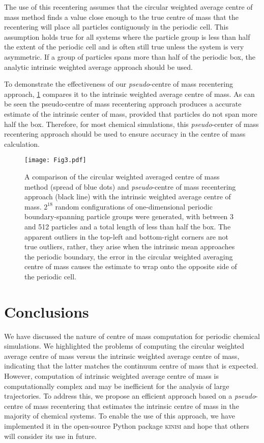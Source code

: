 \documentclass[reprint,superscriptaddress,nobibnotes,amsmath,amssymb,aip]{revtex4-2}
\begin{document}
The use of this recentering assumes that the circular weighted average centre of mass method finds a value close enough to the true centre of mass that the recentering will place all particles contiguously in the periodic cell. 
This assumption holds true for all systems where the particle group is less than half the extent of the periodic cell and is often still true unless the system is very asymmetric. 
If a group of particles spans more than half of the periodic box, the analytic intrinsic weighted average approach should be used. 

To demonstrate the effectiveness of our \emph{pseudo}-centre of mass recentering approach, \cref{fig:method_valid} compares it to the intrinsic weighted average centre of mass. 
As can be seen the pseudo-centre of mass recentering approach produces a accurate estimate of the intrinsic center of mass, provided that particles do not span more half the box. 
Therefore, for most chemical simulations, this \emph{pseudo}-center of mass recentering approach should be used to ensure accuracy in the centre of mass calculation. 
%
\begin{figure}
    \centering
    \texttt{[image: Fig3.pdf]}
    \caption{A comparison of the circular weighted averaged centre of mass method (spread of blue dots) and \emph{pseudo}-centre of mass recentering approach (black line) with the intrinsic weighted average centre of mass. 
    $2^{18}$ random configurations of one-dimensional periodic boundary-spanning particle groups were generated, with between 3 and 512 particles and a total length of less than half the box. 
    The apparent outliers in the top-left and bottom-right corners are not true outliers, rather, they arise when the intrinsic mean approaches the periodic boundary, the error in the circular weighted averaging centre of mass causes the estimate to wrap onto the opposite side of the periodic cell.
    }
    \label{fig:method_valid}
\end{figure}
%

\section{Conclusions}

We have discussed the nature of centre of mass computation for periodic chemical simulations.
We highlighted the problems of computing the circular weighted average centre of mass versus the intrinsic weighted average centre of mass, indicating that the latter matches the continuum centre of mass that is expected. 
However, computation of intrinsic weighted average centre of mass is computationally complex and may be inefficient for the analysis of large trajectories. 
To address this, we propose an efficient approach based on a \emph{pseudo}-centre of mass recentering that estimates the intrinsic centre of mass in the majority of chemical systems. 
To enable the use of this approach, we have implemented it in the open-source Python package \textsc{kinisi}\cite{mccluskey_kinisi_2024} and hope that others will consider its use in future. 
\end{document}
